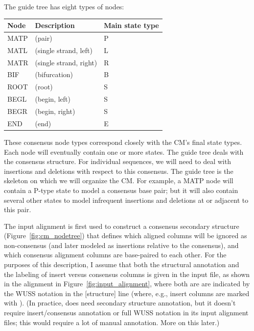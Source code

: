The guide tree has eight types of nodes:

\vspace{0.5em}
\begin{center}
\begin{tabular}{lll}
Node      & Description        &  Main state type          \\ \hline
MATP  & (pair)                 & P \\
MATL  & (single strand, left)  & L \\
MATR  & (single strand, right) & R \\
BIF   & (bifurcation)          & B \\
ROOT  & (root)                 & S \\
BEGL  & (begin, left)          & S \\
BEGR  & (begin, right)         & S \\
END   & (end)                  & E \\
\end{tabular}
\end{center}
\vspace{0.5em}
 
These consensus node types correspond closely with the CM's final
state types. Each node will eventually contain one or more states. The
guide tree deals with the consensus structure. For individual
sequences, we will need to deal with insertions and deletions with
respect to this consensus. The guide tree is the skeleton on which we
will organize the CM. For example, a MATP node will contain a P-type
state to model a consensus base pair; but it will also contain several
other states to model infrequent insertions and deletions at or
adjacent to this pair.

The input alignment is first used to construct a consensus secondary
structure (Figure~\ref{fig:cm_nodetree}) that defines which aligned
columns will be ignored as non-consensus (and later modeled as
insertions relative to the consensus), and which consensus alignment
columns are base-paired to each other. For the purposes of this
description, I assume that both the structural annotation and the
labeling of insert versus consensus columns is given in the input
file, as shown in the alignment in Figure~\ref{fig:input_alignment},
where both are are indicated by the WUSS notation in the [structure]
line (where, e.g., insert columns are marked with ). (In
practice,  does need secondary structure annotation, but
it doesn't require insert/consensus annotation or full WUSS notation
in its input alignment files; this would require a lot of manual
annotation.  More on this later.)

